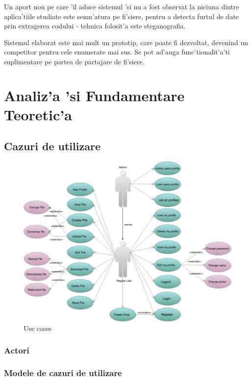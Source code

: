 \documentclass[12pt,a4paper,twoside]{report}
\begin{document}
Un aport nou pe care 'il aduce sistemul 'si nu a fost observat la niciuna dintre aplica'tiile studiate este semn'atura pe fi'siere, pentru a detecta furtul de date prin extragerea codului - tehnica folosit'a este steganografia.


	Sistemul elaborat este mai mult un prototip, care poate fi dezvoltat, devenind un competitor pentru cele enumerate mai sus. Se pot ad'auga func'tionalit'a'ti suplimentare pe partea de partajare de fi'siere. 


\chapter{Analiz'a 'si Fundamentare Teoretic'a}
\label{ch:analysis}

\section{Cazuri de utilizare}
\begin{figure}[H]
\begin{center}
\advance\leftskip-3cm
\advance\rightskip-3cm
\includegraphics[keepaspectratio=true,scale=0.4]{img/use_case_diagram.png}
\caption{Use cases}
\label{use_cases_diagram}
\end{center}
\end{figure}
\subsection{Actori}
\subsection{Modele de cazuri de utilizare}
\end{document}
